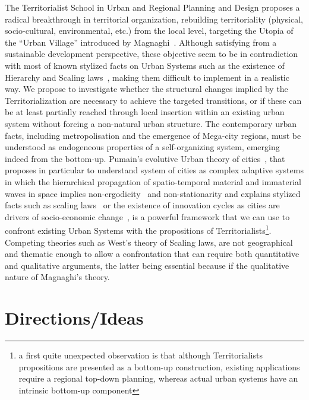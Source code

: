 \documentclass{article}
\begin{document}
The Territorialist School in Urban and Regional Planning and Design proposes a radical breakthrough in territorial organization, rebuilding territoriality (physical, socio-cultural, environmental, etc.) from the local level, targeting the Utopia of the ``Urban Village'' introduced by Magnaghi~\cite{magnaghi2014bioregion}. Although satisfying from a sustainable development perspective, these objective seem to be in contradiction with most of known stylized facts on Urban Systems such as the existence of Hierarchy and Scaling laws~\cite{magnaghi2005local}, making them difficult to implement in a realistic way. We propose to investigate whether the structural changes implied by the Territorialization are necessary to achieve the targeted transitions, or if these can be at least partially reached through local insertion within an existing urban system without forcing a non-natural urban structure. The contemporary urban facts, including metropolisation and the emergence of Mega-city regions, must be understood as endogeneous properties of a self-organizing system, emerging indeed from the bottom-up. Pumain's evolutive Urban theory of cities~\cite{pumain1997pour}, that proposes in particular to understand system of cities as complex adaptive systems in which the hierarchical propagation of spatio-temporal material and immaterial waves in space implies non-ergodicity~\cite{pumain2012urban} and non-stationarity and explains stylized facts such as scaling laws~\cite{pumain2006evolutionary} or the existence of innovation cycles as cities are drivers of socio-economic change~\cite{pumain2010theorie}, is a powerful framework that we can use to confront existing Urban Systems with the propositions of Territorialists\footnote{a first quite unexpected observation is that although Territorialists propositions are presented as a bottom-up construction, existing applications require a regional top-down planning, whereas actual urban systems have an intrinsic bottom-up component}. Competing theories such as West's theory of Scaling laws, are not geographical and thematic enough to allow a confrontation that can require both quantitative and qualitative arguments, the latter being essential because if the qualitative nature of Magnaghi's theory.




\section{Directions/Ideas}
\end{document}
